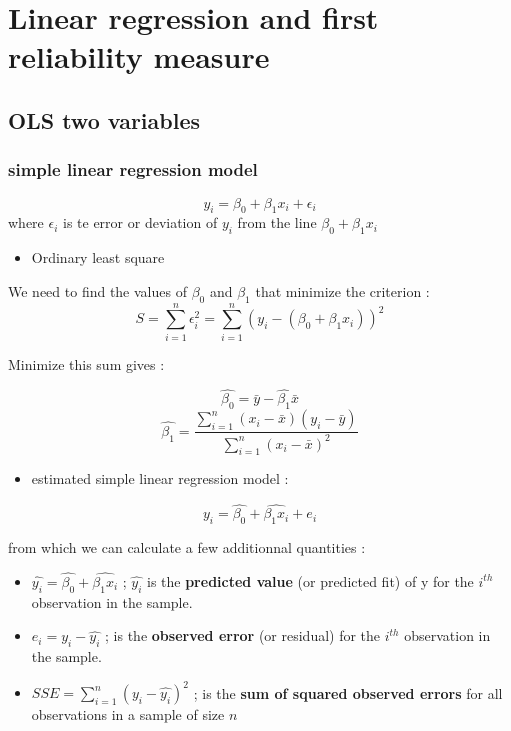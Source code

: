 \documentclass[
]{report}
\providecommand{\tightlist}{%
  \setlength{\itemsep}{0pt}\setlength{\parskip}{0pt}}
\begin{document}
\hypertarget{linear-regression-and-first-reliability-measure}{%
\chapter{Linear regression and first reliability measure}\label{linear-regression-and-first-reliability-measure}}

\hypertarget{ols-two-variables}{%
\section{OLS two variables}\label{ols-two-variables}}

\hypertarget{simple-linear-regression-model}{%
\subsection{simple linear regression model}\label{simple-linear-regression-model}}

\[y_i = \beta_0 + \beta_1x_i +  \epsilon_i\]
where \(\epsilon_i\) is te error or deviation of \(y_i\) from the line \(\beta_0 + \beta_1x_i\)

\begin{itemize}
\tightlist
\item
  Ordinary least square
\end{itemize}

We need to find the values of \(\beta_0\) and \(\beta_1\) that minimize the criterion :
\[S = \sum_{i=1}^n \epsilon_i^2 = \sum_{i=1}^n (y_i - (\beta_0 + \beta_1x_i))^2\]

Minimize this sum gives :

\[\hat{\beta_0}= \bar{y} - \hat{\beta_1}\bar{x}\]
\[\hat{\beta_1}= \frac{\sum_{i=1}^n(x_i -\bar{x})(y_i -\bar{y})}{\sum_{i=1}^n(x_i -\bar{x})^2}\]

\begin{itemize}
\tightlist
\item
  estimated simple linear regression model :
\end{itemize}

\[y_i = \hat{\beta_0} + \hat{\beta_1x_i} +  e_i\]

from which we can calculate a few additionnal quantities :

\begin{itemize}
\item
  \(\hat{y_i} = \hat{\beta_0} + \hat{\beta_1x_i}\) ; \(\hat{y_i}\) is the \textbf{predicted value} (or predicted fit) of y for the \(i^{th}\) observation in the sample.
\item
  \(e_i=y_i -\hat{y_i}\) ; is the \textbf{observed error} (or residual) for the \(i^{th}\) observation in the sample.
\item
  \(SSE = \sum_{i=1}^n (y_i -\hat{y_i})^2\) ; is the \textbf{sum of squared observed errors} for all observations in a sample of size \(n\)
\end{itemize}
\end{document}
